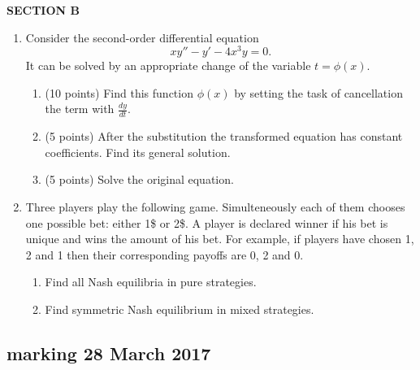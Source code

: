 \documentclass[12pt]{article} %
\theoremstyle{definition} %
\begin{document}
\textbf{SECTION B}

\begin{enumerate}[resume]


\item Consider the second-order differential equation
\[
xy'' - y' - 4{x^3}y = 0.
\]
It can be solved by an appropriate change of the variable $t = \phi (x)$.
\begin{enumerate}
  \item (10 points) Find this function $\phi (x)$ by setting the task of cancellation the term with $\frac{{dy}}{{dt}}$.
  \item (5 points) After the substitution the transformed equation has constant coefficients. Find its general solution.
  \item (5 points) Solve the original equation.
\end{enumerate}

\item Three players play the following game. Simulteneously each of them chooses one possible bet: either 1\$ or 2\$. A player is declared winner if his bet is unique and wins the amount of his bet. For example, if players have chosen 1, 2 and 1 then their corresponding payoffs are 0, 2 and 0.

\begin{enumerate}
  \item Find all Nash equilibria in pure strategies.
  \item Find symmetric Nash equilibrium in mixed strategies.
\end{enumerate}

\end{enumerate}


\subsection{marking 28 March 2017}
\end{document}
